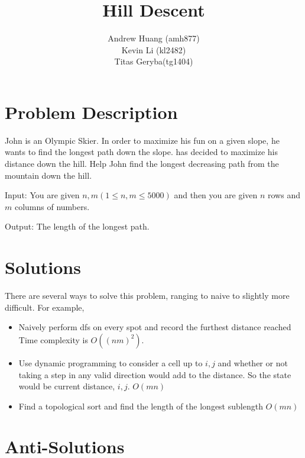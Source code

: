 \documentclass[a4paper,11pt]{article}
\title{Hill Descent}
\author{Andrew Huang (amh877) \\
Kevin Li (kl2482) \\
Titas Geryba(tg1404)}
\begin{document}
\maketitle

\section{Problem Description}

John is an Olympic Skier. In order to maximize his fun on a given slope, he wants to find the longest path down the slope. has decided to maximize his distance down the hill. Help John find the longest decreasing path from the mountain down the hill. 

Input: You are given $n, m (1 \leq n, m \leq 5000)$ and then you are given $n $ rows and $m$ columns of numbers. 

Output: The length of the longest path.



\section{Solutions}

There are several ways to solve this problem, ranging to naive to slightly more difficult.
For example,

\begin{itemize}
    \item Naively perform dfs on every spot and record the furthest distance reached
Time complexity is $O((nm)^2)$.
    \item Use dynamic programming to consider a cell up to $i , j$ and whether or not taking a step in any valid direction would add to the  distance. So the state would be current distance, $i, j$. $O(mn)$
    \item Find a topological sort and find the length of the longest sublength $O(mn)$
\end{itemize}


\section{Anti-Solutions}

\end{document}
